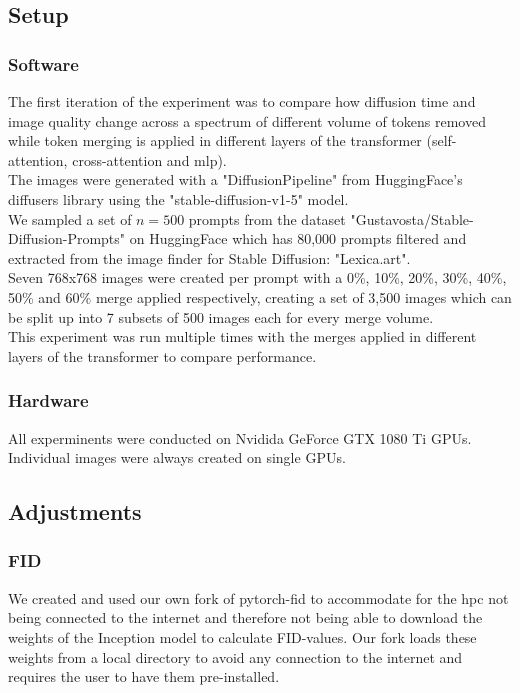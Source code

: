 \documentclass{article}
\begin{document}
\subsection{Setup}
\subsubsection*{Software}
The first iteration of the experiment was to compare how diffusion time and image quality change across a spectrum of different volume of tokens  removed while token merging is applied in different layers of the transformer (self-attention, cross-attention and mlp).\\
The images were generated with a "DiffusionPipeline" from HuggingFace's diffusers library using the "stable-diffusion-v1-5" model\cite{Rombach_2022_CVPR}.\\
We sampled a set of \(n=500\) prompts from the dataset "Gustavosta/Stable-Diffusion-Prompts" on HuggingFace which has 80,000 prompts filtered and extracted from the image finder for Stable Diffusion: "Lexica.art".\\
Seven 768x768 images were created per prompt with a 0\%, 10\%, 20\%, 30\%, 40\%, 50\% and 60\% merge applied respectively, creating a set of 3,500 images which can be split up into 7 subsets of 500 images each for every merge volume.\\
This experiment was run multiple times with the merges applied in different layers of the transformer to compare performance.

\subsubsection*{Hardware}
All experminents were conducted on Nvidida GeForce GTX 1080 Ti GPUs. Individual images were always created on single GPUs.

\subsection{Adjustments}
\subsubsection*{FID}
We created and used our own fork of pytorch-fid\cite{Seitzer2020FID} to accommodate for the hpc not being connected to the internet and therefore not being able to download the weights of the Inception model to calculate FID-values. Our fork loads these weights from a local directory to avoid any connection to the internet and requires the user to have them pre-installed.
\end{document}
